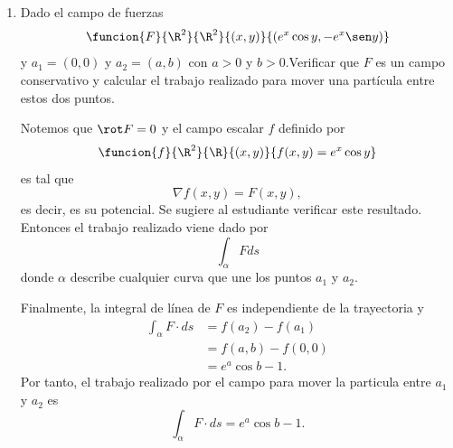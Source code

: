 \documentclass[a4,11pt]{aleph-examen}
\begin{document}
\begin{preguntas}
\begin{respuesta}
\begin{respuesta}
\begin{respuesta}
\begin{enumerate}
\begin{respuesta}

	\[
     \int_\alpha F\cdot ds=\dfrac{131}{8}.
    \]
\end{respuesta}



\item 
    Dado el campo de fuerzas
    \[
        \funcion{F}{\R^2}{\R^2}
        {(x,y)}{(e^x\cos y,-e^x\sen y)}
	\]
    y $a_1=(0,0)$ y $a_2=(a,b)$ con $a>0$ y $b>0$.Verificar que $F$ es un campo conservativo y calcular el trabajo realizado para mover una partícula entre estos dos puntos. 
\begin{respuesta}
    Notemos que $\rot F=0$ y el campo escalar $f$ definido por
    \[
    \funcion{f}{\R^2}{\R}
    {(x,y)}{f(x,y)=e^x\cos y}
	\]
	es tal que 
    \[
    \nabla f(x,y) = F(x,y),
    \]
    es decir, es su potencial. Se sugiere al estudiante verificar este resultado. 
    Entonces el trabajo realizado viene dado por
    \[
        \int_\alpha Fds
    \]
    donde $\alpha$ describe cualquier curva que une los puntos $a_1$ y $a_2$.
    
    Finalmente, la integral de línea de $F$ es independiente de la trayectoria y
    \begin{align*}
    \int_{\alpha}{F\cdot ds} &=  f(a_2) - f(a_1)\\
    		&=  f(a,b) - f(0,0)\\
            &= e^a\cos b - 1.
    \end{align*}
    Por tanto, el trabajo realizado por el campo para mover la particula entre $a_1$ y $a_2$ es
    \[
    \int_{\alpha}{F\cdot ds} = e^a\cos b - 1.
    \]
\end{respuesta}


\end{enumerate}
\end{respuesta}
\end{respuesta}
\end{respuesta}
\end{preguntas}
\end{document}
